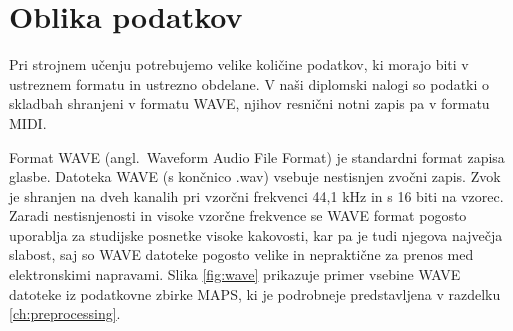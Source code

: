 \documentclass[a4paper, 12pt, openright]{book}
\newcommand{\en}{angl.}
\begin{document}
\section{Oblika podatkov}

Pri strojnem učenju potrebujemo velike količine podatkov, ki morajo biti v ustreznem formatu in ustrezno obdelane.
V naši diplomski nalogi so podatki o skladbah shranjeni v formatu WAVE, njihov resnični notni zapis pa v formatu MIDI.

Format WAVE (\en\ Waveform Audio File Format) je standardni format zapisa glasbe.
Datoteka WAVE (s končnico .wav) vsebuje nestisnjen zvočni zapis.
Zvok je shranjen na dveh kanalih pri vzorčni frekvenci 44,1 kHz in s 16 biti na vzorec.
Zaradi nestisnjenosti in visoke vzorčne frekvence se WAVE format pogosto uporablja za studijske posnetke visoke kakovosti, kar pa je tudi njegova največja slabost, saj so WAVE datoteke pogosto velike in nepraktične za prenos med elektronskimi napravami.
Slika \ref{fig:wave} prikazuje primer vsebine WAVE datoteke iz podatkovne zbirke MAPS, ki je podrobneje predstavljena v razdelku \ref{ch:preprocessing}.
\end{document}
